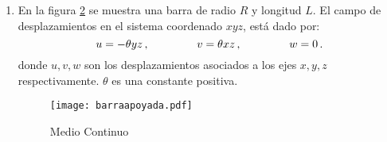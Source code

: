 \documentclass[../notas medios.tex]{subfiles}
\begin{document}
\begin{enumerate}
Si en un suelo sometido a la acción de dos estructuras que le transmiten  una 
carga lineal superficial, $P$ y $3P$, respectivamente tal como se muestra en la 
figura  \cref{figure3} se desea instalar una tubería, perpendicular al plano 
mostrado ($XY$), de diámetro despreciable, en el punto indicado  en la figura 
\cref{figure3}.
\begin{figure}[H]
	\centering
	\texttt{[image: ProblemTub.pdf]} 
	\caption{Estructuras y tubería.}
	\label{figure3}
\end{figure} 

\begin{enumerate}
\item Determine cuál es el valor de la deformación axial máxima.

\item  Si la máxima deformación angular a la que puede ser sometida la 
tubería sin fallar, es igual a: $\gamma_{\max}$. ¿Cuál es el máximo valor 
de la carga distribuida $P$ que pueden transmitir las estructuras para que 
la tubería no falle?

\item Esboce la configuración deformada de la partícula correspondiente al 
punto donde se ubica la tubería. Solo considere el plano $xy$. 
\end{enumerate}


\item \label{punto08_d} En la figura \cref{BarraApoya} se muestra una barra de 
radio $R$ y longitud $L$. El campo de desplazamientos   en el sistema 
coordenado $xyz$, está dado por:
\[u= -\theta yz\, , \hspace{15mm} v= \theta xz\, , \hspace{15mm} w= 0\, .\]
donde $u,v,w$ son los desplazamientos asociados a los ejes $x,y,z$ 
respectivamente. $\theta$ es una constante positiva.
\begin{figure}[H]
	\centering
	\texttt{[image: barraapoyada.pdf]} 
	\caption{Medio Continuo}
	\label{BarraApoya}
\end{figure}


\end{enumerate}
\end{document}
